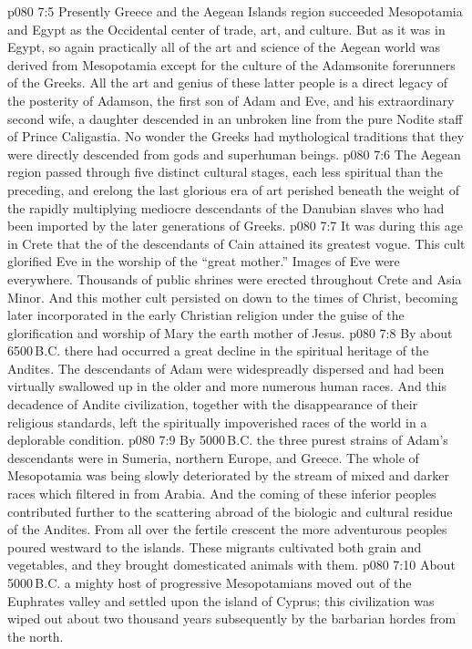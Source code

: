\vs p080 7:5 \pc Presently Greece and the Aegean Islands region succeeded Mesopotamia and Egypt as the Occidental center of trade, art, and culture. But as it was in Egypt, so again practically all of the art and science of the Aegean world was derived from Mesopotamia except for the culture of the Adamsonite forerunners of the Greeks. All the art and genius of these latter people is a direct legacy of the posterity of Adamson, the first son of Adam and Eve, and his extraordinary second wife, a daughter descended in an unbroken line from the pure Nodite staff of Prince Caligastia. No wonder the Greeks had mythological traditions that they were directly descended from gods and superhuman beings.
\vs p080 7:6 The Aegean region passed through five distinct cultural stages, each less spiritual than the preceding, and erelong the last glorious era of art perished beneath the weight of the rapidly multiplying mediocre descendants of the Danubian slaves who had been imported by the later generations of Greeks.
\vs p080 7:7 It was during this age in Crete that the  of the descendants of Cain attained its greatest vogue. This cult glorified Eve in the worship of the “great mother.” Images of Eve were everywhere. Thousands of public shrines were erected throughout Crete and Asia Minor. And this mother cult persisted on down to the times of Christ, becoming later incorporated in the early Christian religion under the guise of the glorification and worship of Mary the earth mother of Jesus.
\vs p080 7:8 \pc By about 6500\,B.C. there had occurred a great decline in the spiritual heritage of the Andites. The descendants of Adam were widespreadly dispersed and had been virtually swallowed up in the older and more numerous human races. And this decadence of Andite civilization, together with the disappearance of their religious standards, left the spiritually impoverished races of the world in a deplorable condition.
\vs p080 7:9 \pc By 5000\,B.C. the three purest strains of Adam’s descendants were in Sumeria, northern Europe, and Greece. The whole of Mesopotamia was being slowly deteriorated by the stream of mixed and darker races which filtered in from Arabia. And the coming of these inferior peoples contributed further to the scattering abroad of the biologic and cultural residue of the Andites. From all over the fertile crescent the more adventurous peoples poured westward to the islands. These migrants cultivated both grain and vegetables, and they brought domesticated animals with them.
\vs p080 7:10 About 5000\,B.C. a mighty host of progressive Mesopotamians moved out of the Euphrates valley and settled upon the island of Cyprus; this civilization was wiped out about two thousand years subsequently by the barbarian hordes from the north.
